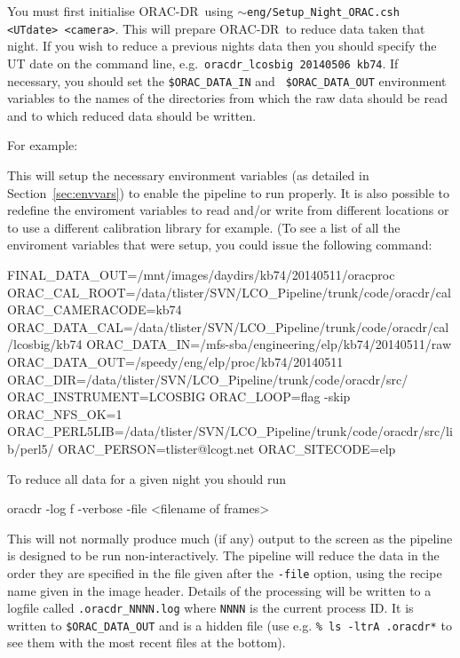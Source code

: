 \documentclass[twoside,11pt,nolof]{starlink}
\providecommand{\ORACDR}{{\footnotesize ORAC-DR}}
\begin{document}
You must first initialise \ORACDR\ using
\texttt{$\sim$eng/Setup\_Night\_ORAC.csh <UTdate> <camera>}. This will prepare
\ORACDR\ to reduce data taken that night. If you wish to reduce a previous
nights data then you should specify the UT date on the command line, e.g.\
\texttt{oracdr\_lcosbig 20140506 kb74}. If necessary, you should set the
\texttt{\$ORAC\_DATA\_IN} and \texttt{ \$ORAC\_DATA\_OUT} environment variables
to the names of the directories from which the raw data should be read and to
which reduced data should be written.

For example:

\begin{terminalv}
\end{terminalv}

This will setup the necessary environment variables (as detailed in
Section~\ref{sec:envvars}) to enable the pipeline to run properly. It is
also possible to redefine the enviroment variables to read and/or write from
different locations or to use a different calibration library for example. (To
see a list of all the enviroment variables that were setup, you could issue the
following command:
\begin{terminalv}
      FINAL_DATA_OUT=/mnt/images/daydirs/kb74/20140511/oracproc
      ORAC_CAL_ROOT=/data/tlister/SVN/LCO_Pipeline/trunk/code/oracdr/cal
      ORAC_CAMERACODE=kb74
      ORAC_DATA_CAL=/data/tlister/SVN/LCO_Pipeline/trunk/code/oracdr/cal/lcosbig/kb74
      ORAC_DATA_IN=/mfs-sba/engineering/elp/kb74/20140511/raw
      ORAC_DATA_OUT=/speedy/eng/elp/proc/kb74/20140511
      ORAC_DIR=/data/tlister/SVN/LCO_Pipeline/trunk/code/oracdr/src/
      ORAC_INSTRUMENT=LCOSBIG
      ORAC_LOOP=flag -skip
      ORAC_NFS_OK=1
      ORAC_PERL5LIB=/data/tlister/SVN/LCO_Pipeline/trunk/code/oracdr/src/lib/perl5/
      ORAC_PERSON=tlister@lcogt.net
      ORAC_SITECODE=elp 
\end{terminalv}

To reduce all data for a given night you should run 

\begin{terminalv}
      oracdr -log f -verbose -file <filename of frames>
\end{terminalv}

This will not normally produce much (if any) output to the screen as the
pipeline is designed to be run non-interactively. The pipeline will reduce the
data in the order they are specified in the file given after the \verb+-file+
option, using the recipe name given in the image header. Details of the
processing will be written to a logfile called \texttt{.oracdr\_NNNN.log} where
\texttt{NNNN} is the current process ID. It is written to
\texttt{\$ORAC\_DATA\_OUT} and is a hidden file (use e.g. \verb+% ls -ltrA .oracdr*+ 
to see them with the most recent files at the bottom).
\end{document}
